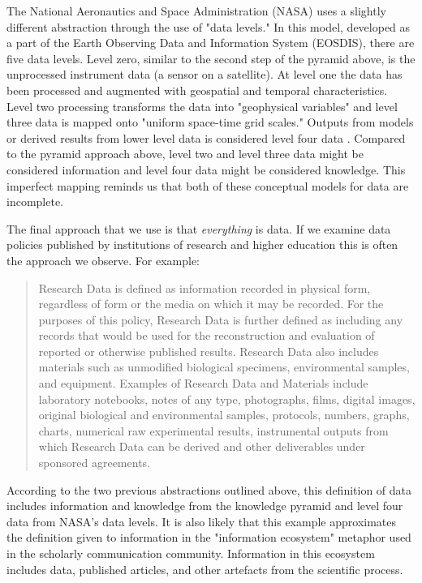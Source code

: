 The National Aeronautics and Space Administration (NASA) uses a slightly different abstraction through the use of "data levels." In this model, developed as a part of the Earth Observing Data and Information System (EOSDIS), there are five data levels. Level zero, similar to the second step of the pyramid above, is the unprocessed instrument data (a sensor on a satellite). At level one the data has been processed and augmented with geospatial and temporal characteristics. Level two processing transforms the data into "geophysical variables" and level three data is mapped onto "uniform space-time grid scales." Outputs from models or derived results from lower level data is considered level four data \cite{nasa_2010}. Compared to the pyramid approach above, level two and level three data might be considered information and level four data might be considered knowledge. This imperfect mapping reminds us that both of these conceptual models for data are incomplete.

The final approach that we use is that \textit{everything} is data. If we examine data policies published by institutions of research and higher education this is often the approach we observe. For example: 

\begin{quote}
Research Data is defined as information recorded in physical form, regardless of form or the media on which it may be recorded. For the purposes of this policy, Research Data is further defined as including any records that would be used for the reconstruction and evaluation of reported or otherwise published results. Research Data also includes materials such as unmodified biological specimens, environmental samples, and equipment. Examples of Research Data and Materials include laboratory notebooks, notes of any type, photographs, films, digital images, original biological and environmental samples, protocols, numbers, graphs, charts, numerical raw experimental results, instrumental outputs from which Research Data can be derived and other deliverables under sponsored agreements. \cite{jhu_2008}
\end{quote}

According to the two previous abstractions outlined above, this definition of data includes information and knowledge from the knowledge pyramid and level four data from NASA's data levels. It is also likely that this example approximates the definition given to information in the "information ecosystem" metaphor used in the scholarly communication community. Information in this ecosystem includes data, published articles, and other artefacts from the scientific process.
